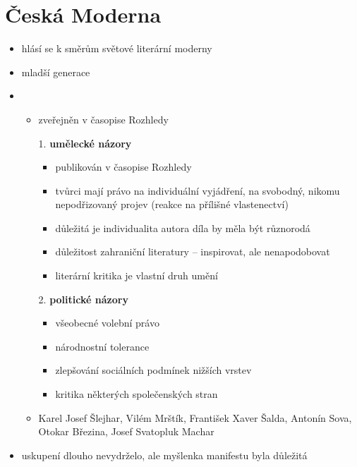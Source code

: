 \section{Česká Moderna}
\begin{itemize}
\item hlásí se k směrům světové literární moderny
\item mladší generace 
\item {}
	\begin{itemize}
	\item zveřejněn v časopise Rozhledy
	\item[1.]\textbf{ umělecké názory}
		\begin{itemize}		
		\item publikován v časopise Rozhledy
		\item tvůrci mají právo na individuální vyjádření, na svobodný, nikomu nepodřizovaný projev (reakce na přílišné vlastenectví)
		\item důležitá je individualita autora \ra díla by měla být různorodá
		\item důležitost zahraniční literatury -- inspirovat, ale nenapodobovat
		\item literární kritika je vlastní druh umění
		\end{itemize}
	\item[2.] \textbf{politické názory}
		\begin{itemize}
		\item všeobecné volební právo
		\item národnostní tolerance
		\item zlepšování sociálních podmínek nižších vrstev
		\item kritika některých společenských stran
		\end{itemize}
	\item Karel Josef Šlejhar, Vilém Mrštík, František Xaver Šalda, Antonín Sova, Otokar Březina, Josef Svatopluk Machar
\end{itemize}
\item uskupení dlouho nevydrželo, ale myšlenka manifestu byla důležitá
\end{itemize}

